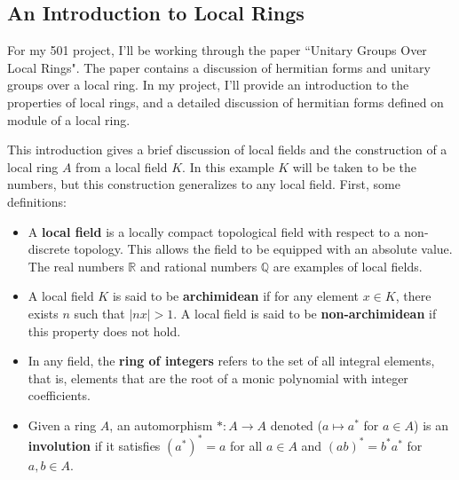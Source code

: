 \begin{center}
\section{An Introduction to Local Rings}
\end{center}

For my 501 project, I'll be working through the paper ``Unitary Groups Over Local Rings"\cite{cruickshank}.
The paper contains a discussion of hermitian forms and unitary groups over a local ring.
In my project, I'll provide an introduction to the properties of local rings, and a detailed discussion of hermitian forms
defined on module of a local ring.

This introduction gives a brief discussion of local fields and the construction of a local ring $A$ from a local field $K$.
In this example $K$ will be taken to be the \padic numbers, but this construction generalizes to any local field.
First, some definitions:

\begin{itemize}[noitemsep]
\item A \textbf{local field} is a locally compact topological field with respect to a non-discrete topology.
This allows the field to be equipped with an absolute value.
The real numbers $\mathbb{R}$ and rational numbers $\mathbb{Q}$ are examples of local fields.
\item A local field $K$ is said to be \textbf{archimidean} if for any element $x \in K$, there exists $n$ such that $|nx| > 1$.
A local field is said to be \textbf{non-archimidean} if this property does not hold.
\item In any field, the \textbf{ring of integers} refers to the set of all integral elements, that is, 
elements that are the root of a monic polynomial with integer coefficients.
\item Given a ring $A$, an automorphism $*: A \to A$ denoted ($a \mapsto a^*$ for $a \in A$) is an \textbf{involution} 
if it satisfies $(a^*)^* = a$ for all $a \in A$ and $(ab)^* = b^* a^*$ for $a, b \in A$.
\end{itemize}

